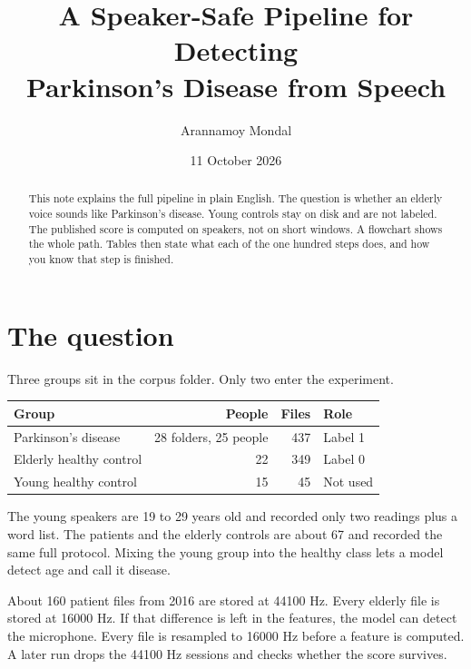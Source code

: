 \documentclass[11pt]{article}
\title{A Speaker-Safe Pipeline for Detecting\\ Parkinson's Disease from Speech}
\author{Arannamoy Mondal}
\date{11 October 2026}
\begin{document}
\maketitle

\begin{abstract}
This note explains the full pipeline in plain English. The question is whether an elderly voice sounds like Parkinson's disease. Young controls stay on disk and are not labeled. The published score is computed on speakers, not on short windows. A flowchart shows the whole path. Tables then state what each of the one hundred steps does, and how you know that step is finished.
\end{abstract}

\section{The question}

Three groups sit in the corpus folder. Only two enter the experiment.

\begin{center}
\begin{tabular}{lrrl}
\toprule
Group & People & Files & Role \\
\midrule
Parkinson's disease & 28 folders, 25 people & 437 & Label 1 \\
Elderly healthy control & 22 & 349 & Label 0 \\
Young healthy control & 15 & 45 & Not used \\
\bottomrule
\end{tabular}
\end{center}

The young speakers are 19 to 29 years old and recorded only two readings plus a word list. The patients and the elderly controls are about 67 and recorded the same full protocol. Mixing the young group into the healthy class lets a model detect age and call it disease.

About 160 patient files from 2016 are stored at 44100 Hz. Every elderly file is stored at 16000 Hz. If that difference is left in the features, the model can detect the microphone. Every file is resampled to 16000 Hz before a feature is computed. A later run drops the 44100 Hz sessions and checks whether the score survives.

\begin{center}
\end{center}
\end{document}
